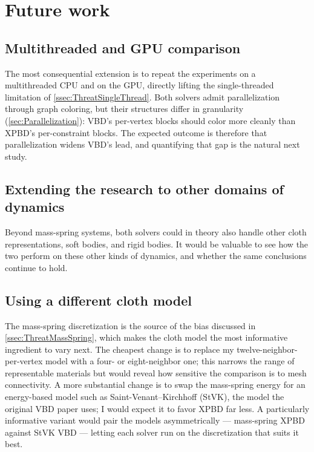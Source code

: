\section{Future work}
\label{sec:FutureWork}

\subsection{Multithreaded and GPU comparison}
\label{ssec:FWParallel}
The most consequential extension is to repeat the experiments on a multithreaded
CPU and on the GPU, directly lifting the single-threaded limitation of
\autoref{ssec:ThreatSingleThread}. Both solvers admit parallelization through
graph coloring, but their structures differ in granularity
(\autoref{sec:Parallelization}): VBD's per-vertex blocks should color more cleanly
than XPBD's per-constraint blocks. The expected outcome is therefore that
parallelization widens VBD's lead, and quantifying that gap is the natural next
study.

\subsection{Extending the research to other domains of dynamics}
\label{ssec:FWOtherDynamics}
Beyond mass-spring systems, both solvers could in theory also handle other cloth
representations, soft bodies, and rigid bodies. It would be valuable to see how the
two perform on these other kinds of dynamics, and whether the same conclusions
continue to hold.

\subsection{Using a different cloth model}
\label{ssec:FWFEM}
The mass-spring discretization is the source of the bias discussed in
\autoref{ssec:ThreatMassSpring}, which makes the cloth model the most informative
ingredient to vary next. The cheapest change is to replace my
twelve-neighbor-per-vertex model with a four- or eight-neighbor one; this narrows
the range of representable materials but would reveal how sensitive the comparison
is to mesh connectivity. A more substantial change is to swap the mass-spring
energy for an energy-based model such as Saint-Venant--Kirchhoff (StVK), the model
the original VBD paper uses; I would expect it to favor XPBD far less. A
particularly informative variant would pair the models asymmetrically ---
mass-spring XPBD against StVK VBD --- letting each solver run on the discretization
that suits it best.

